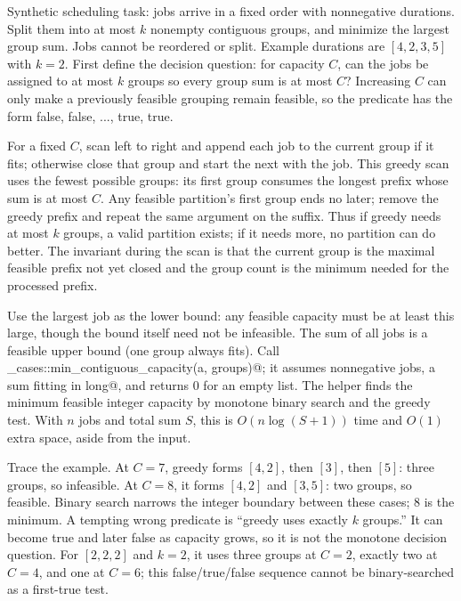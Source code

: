 Synthetic scheduling task: jobs arrive in a fixed order with nonnegative
durations. Split them into at most $k$ nonempty contiguous groups, and
minimize the largest group sum. Jobs cannot be reordered or split. Example
durations are $[4,2,3,5]$ with $k=2$. First define the decision question: for
capacity $C$, can
the jobs be assigned to at most $k$ groups so every group sum is at most
$C$? Increasing $C$ can only make a previously feasible grouping remain
feasible, so the predicate has the form false, false, ..., true, true.

For a fixed $C$, scan left to right and append each job to the current group
if it fits; otherwise close that group and start the next with the job. This
greedy scan uses the fewest possible groups: its first group consumes the
longest prefix whose sum is at most $C$. Any feasible partition's first
group ends no later; remove the greedy prefix and repeat the same argument
on the suffix. Thus if greedy needs at most $k$ groups, a valid partition
exists; if it needs more, no partition can do better. The invariant during
the scan is that the current group is the maximal feasible prefix not yet
closed and the group count is the minimum needed for the processed prefix.

Use the largest job as the lower bound: any feasible capacity must be at
least this large, though the bound itself need not be infeasible. The sum of
all jobs is a feasible upper bound (one group always fits). Call
\verb@finals_cases::min_contiguous_capacity(a, groups)@; it assumes
nonnegative jobs, a sum fitting in \verb@long long@, and returns 0 for an
empty list. The helper finds the minimum feasible integer capacity by
monotone binary search and the greedy test. With $n$ jobs and total sum $S$,
this is $O(n\log(S+1))$ time and $O(1)$ extra space, aside from the input.

Trace the example. At $C=7$, greedy forms $[4,2]$, then $[3]$, then $[5]$:
three groups, so infeasible. At $C=8$, it forms $[4,2]$ and $[3,5]$: two
groups, so feasible. Binary search narrows the integer boundary between
these cases; 8 is the minimum. A tempting wrong predicate is ``greedy uses
exactly $k$ groups.'' It can become true and later false as capacity grows,
so it is not the monotone decision question. For $[2,2,2]$ and $k=2$, it
uses three groups at $C=2$, exactly two at $C=4$, and one at $C=6$; this
false/true/false sequence cannot be binary-searched as a first-true test.

